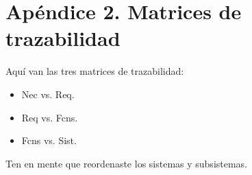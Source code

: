 \chapter{Ap\'endice 2. Matrices de trazabilidad} \label{apendice:matrices}

\noindent Aqu\'i van las tres matrices de trazabilidad:

\begin{itemize}
	\item	Nec vs. Req.
	\item	Req vs. Fcns.
	\item	Fcns vs. Sist.
\end{itemize}

\noindent Ten en mente que reordenaste los sistemas y subsistemas.